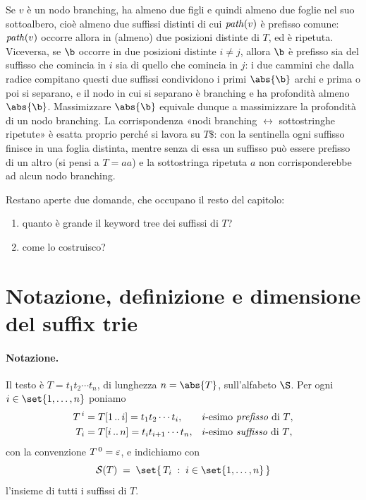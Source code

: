 \begin{dimostrazione}
Se $v$ è un nodo branching, ha almeno due figli e quindi almeno due foglie nel suo
sottoalbero, cioè almeno due suffissi distinti di cui $\mathit{path}(v)$ è prefisso comune:
$\mathit{path}(v)$ occorre allora in (almeno) due posizioni distinte di $T$, ed è ripetuta.
Viceversa, se $\b$ occorre in due posizioni distinte $i \neq j$, allora $\b$ è prefisso sia
del suffisso che comincia in $i$ sia di quello che comincia in $j$: i due cammini che dalla
radice compitano questi due suffissi condividono i primi $\abs{\b}$ archi e prima o poi si
separano, e il nodo in cui si separano è branching e ha profondità almeno $\abs{\b}$.
Massimizzare $\abs{\b}$ equivale dunque a massimizzare la profondità di un nodo branching.
La corrispondenza «nodi branching $\leftrightarrow$ sottostringhe ripetute» è esatta proprio
perché si lavora su $T\$$: con la sentinella ogni suffisso finisce in una foglia distinta,
mentre senza di essa un suffisso può essere prefisso di un altro (si pensi a $T = aa$) e la
sottostringa ripetuta $a$ non corrisponderebbe ad alcun nodo branching.
\end{dimostrazione}

Restano aperte due domande, che occupano il resto del capitolo:
\begin{enumerate}
  \item quanto è grande il keyword tree dei suffissi di $T$?
  \item come lo costruisco?
\end{enumerate}

\section{Notazione, definizione e dimensione del suffix trie}

\paragraph{Notazione.}
Il testo è $T = t_1 t_2 \cdots t_n$, di lunghezza $n = \abs{T}$, sull'alfabeto $\S$. Per ogni
$i \in \set{1,\dots,n}$ poniamo
\begin{align*}
  T^{\,i} &= T[1\,..\,i] = t_1 t_2 \cdots t_i,
          & &\text{$i$-esimo \emph{prefisso} di $T$},\\
  T_{i}   &= T[i\,..\,n] = t_i t_{i+1} \cdots t_n,
          & &\text{$i$-esimo \emph{suffisso} di $T$},
\end{align*}
con la convenzione $T^{\,0} = \varepsilon$, e indichiamo con
\[
  \mathcal{S}(T) \;=\; \set{\, T_i \;:\; i \in \set{1,\dots,n} \,}
\]
l'insieme di tutti i suffissi di $T$.

